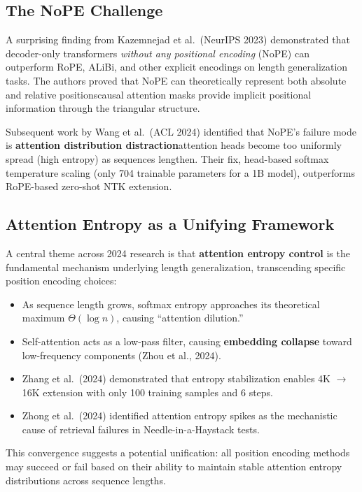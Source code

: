 \documentclass[11pt,a4paper]{article}
\begin{document}
\subsection{The NoPE Challenge}

A surprising finding from Kazemnejad et al.\ (NeurIPS 2023) demonstrated that decoder-only transformers \textit{without any positional encoding} (NoPE) can outperform RoPE, ALiBi, and other explicit encodings on length generalization tasks. The authors proved that NoPE can theoretically represent both absolute and relative positions\textemdash causal attention masks provide implicit positional information through the triangular structure.

Subsequent work by Wang et al.\ (ACL 2024) identified that NoPE's failure mode is \textbf{attention distribution distraction}\textemdash attention heads become too uniformly spread (high entropy) as sequences lengthen. Their fix, head-based softmax temperature scaling (only 704 trainable parameters for a 1B model), outperforms RoPE-based zero-shot NTK extension.

\subsection{Attention Entropy as a Unifying Framework}

A central theme across 2024 research is that \textbf{attention entropy control} is the fundamental mechanism underlying length generalization, transcending specific position encoding choices:

\begin{itemize}[leftmargin=*]
    \item As sequence length grows, softmax entropy approaches its theoretical maximum $\Theta(\log n)$, causing ``attention dilution.''
    \item Self-attention acts as a low-pass filter, causing \textbf{embedding collapse} toward low-frequency components (Zhou et al., 2024).
    \item Zhang et al.\ (2024) demonstrated that entropy stabilization enables 4K $\to$ 16K extension with only 100 training samples and 6 steps.
    \item Zhong et al.\ (2024) identified attention entropy spikes as the mechanistic cause of retrieval failures in Needle-in-a-Haystack tests.
\end{itemize}

This convergence suggests a potential unification: all position encoding methods may succeed or fail based on their ability to maintain stable attention entropy distributions across sequence lengths.
\end{document}

